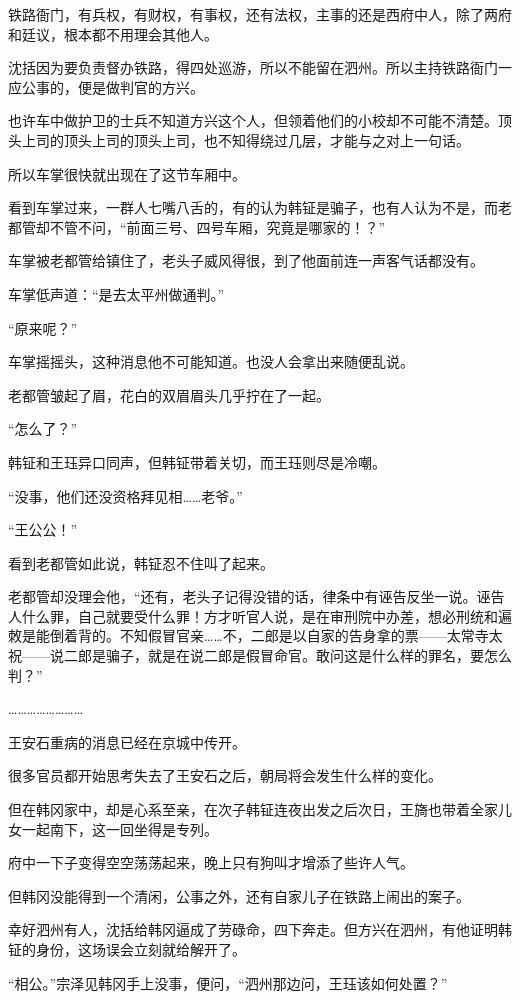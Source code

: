 铁路衙门，有兵权，有财权，有事权，还有法权，主事的还是西府中人，除了两府和廷议，根本都不用理会其他人。

沈括因为要负责督办铁路，得四处巡游，所以不能留在泗州。所以主持铁路衙门一应公事的，便是做判官的方兴。

也许车中做护卫的士兵不知道方兴这个人，但领着他们的小校却不可能不清楚。顶头上司的顶头上司的顶头上司，也不知得绕过几层，才能与之对上一句话。

所以车掌很快就出现在了这节车厢中。

看到车掌过来，一群人七嘴八舌的，有的认为韩钲是骗子，也有人认为不是，而老都管却不管不问，“前面三号、四号车厢，究竟是哪家的！？”

车掌被老都管给镇住了，老头子威风得很，到了他面前连一声客气话都没有。

车掌低声道：“是去太平州做通判。”

“原来呢？”

车掌摇摇头，这种消息他不可能知道。也没人会拿出来随便乱说。

老都管皱起了眉，花白的双眉眉头几乎拧在了一起。

“怎么了？”

韩钲和王珏异口同声，但韩钲带着关切，而王珏则尽是冷嘲。

“没事，他们还没资格拜见相……老爷。”

“王公公！”

看到老都管如此说，韩钲忍不住叫了起来。

老都管却没理会他，“还有，老头子记得没错的话，律条中有诬告反坐一说。诬告人什么罪，自己就要受什么罪！方才听官人说，是在审刑院中办差，想必刑统和遍敇是能倒着背的。不知假冒官亲……不，二郎是以自家的告身拿的票——太常寺太祝——说二郎是骗子，就是在说二郎是假冒命官。敢问这是什么样的罪名，要怎么判？”

……………………

王安石重病的消息已经在京城中传开。

很多官员都开始思考失去了王安石之后，朝局将会发生什么样的变化。

但在韩冈家中，却是心系至亲，在次子韩钲连夜出发之后次日，王旖也带着全家儿女一起南下，这一回坐得是专列。

府中一下子变得空空荡荡起来，晚上只有狗叫才增添了些许人气。

但韩冈没能得到一个清闲，公事之外，还有自家儿子在铁路上闹出的案子。

幸好泗州有人，沈括给韩冈逼成了劳碌命，四下奔走。但方兴在泗州，有他证明韩钲的身份，这场误会立刻就给解开了。

“相公。”宗泽见韩冈手上没事，便问，“泗州那边问，王珏该如何处置？”

